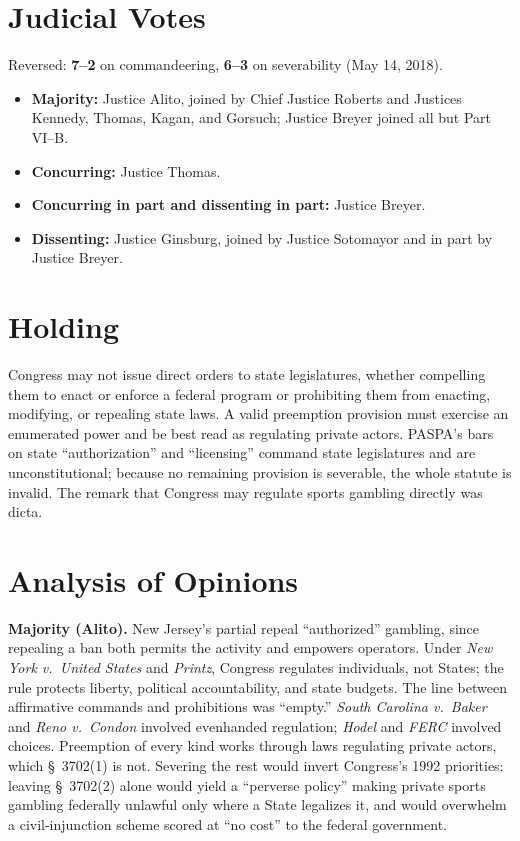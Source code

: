 \documentclass[12pt]{article}
\begin{document}
\section{Judicial Votes}

Reversed: \textbf{7--2} on commandeering, \textbf{6--3} on severability (May 14, 2018).
\begin{itemize}
\item \textbf{Majority:} Justice Alito, joined by Chief Justice Roberts and Justices Kennedy, Thomas, Kagan, and Gorsuch; Justice Breyer joined all but Part VI--B.
\item \textbf{Concurring:} Justice Thomas.
\item \textbf{Concurring in part and dissenting in part:} Justice Breyer.
\item \textbf{Dissenting:} Justice Ginsburg, joined by Justice Sotomayor and in part by Justice Breyer.
\end{itemize}

\section{Holding}

Congress may not issue direct orders to state legislatures, whether compelling them to enact or enforce a federal program or prohibiting them from enacting, modifying, or repealing state laws. A valid preemption provision must exercise an enumerated power and be best read as regulating private actors. PASPA's bars on state ``authorization'' and ``licensing'' command state legislatures and are unconstitutional; because no remaining provision is severable, the whole statute is invalid. The remark that Congress may regulate sports gambling directly was dicta.

\section{Analysis of Opinions}

\textbf{Majority (Alito).} New Jersey's partial repeal ``authorized'' gambling, since repealing a ban both permits the activity and empowers operators. Under \textit{New York v.\ United States} and \textit{Printz}, Congress regulates individuals, not States; the rule protects liberty, political accountability, and state budgets. The line between affirmative commands and prohibitions was ``empty.'' \textit{South Carolina v.\ Baker} and \textit{Reno v.\ Condon} involved evenhanded regulation; \textit{Hodel} and \textit{FERC} involved choices. Preemption of every kind works through laws regulating private actors, which \S~3702(1) is not. Severing the rest would invert Congress's 1992 priorities: leaving \S~3702(2) alone would yield a ``perverse policy'' making private sports gambling federally unlawful only where a State legalizes it, and would overwhelm a civil-injunction scheme scored at ``no cost'' to the federal government.
\end{document}
